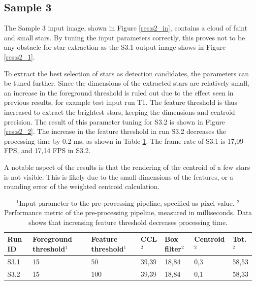 \documentclass[12pt]{report}
\begin{document}
\subsection*{Sample 3}
The Sample 3 input image, shown in Figure \ref{res:s2_in}, contains a cloud of faint and small stars. By tuning the input parameters correctly, this proves not to be any obstacle for star extraction as the S3.1 output image shows in Figure \ref{res:s2_1}.
\par
To extract the best selection of stars as detection candidates, the parameters can be tuned further. Since the dimensions of the extracted stars are relatively small, an increase in the foreground threshold is ruled out due to the effect seen in previous results, for example test input run T1. The feature threshold is thus increased to extract the brightest stars, keeping the dimensions and centroid precision. The result of this parameter tuning for S3.2 is shown in Figure \ref{res:s2_2}. The increase in the feature threshold in run S3.2 decreases the processing time by 0.2 ms, as shown in Table \ref{table:s2_res}. The frame rate of S3.1 is 17,09 FPS, and 17,14 FPS in S3.2.
\par
A notable aspect of the results is that the rendering of the centroid of a few stars is not visible. This is likely due to the small dimensions of the features, or a rounding error of the weighted centroid calculation.

\begin{table}[!h]
    \centering
    \begin{tabular}{|p{0.8cm}|p{2.5cm}|p{2cm}||p{1.25cm}|p{1.25cm}|p{1.9cm}|p{1cm}|}
        \hline
        \textbf{Run ID}&\textbf{Foreground threshold$^{1}$}&\textbf{Feature threshold$^{1}$}&\textbf{CCL$^{2}$}&\textbf{Box filter$^{2}$}&\textbf{Centroid$^{2}$}&\textbf{Tot.$^{2}$}\\
        \hline
        \hline
        S3.1&15&50&39,39&18,84&0,3&58,53\\
        \hline
        S3.2&15&100&39,39&18,84&0,1&58,33\\
        \hline
    \end{tabular}
    \caption{$^{1}$Input parameter to the pre-processing pipeline, specified as pixel value. $^{2}$Performance metric of the pre-processing pipeline, measured in milliseconds. Data shows that increasing feature threshold decreases processing time.}
    \label{table:s2_res}
\end{table}
\end{document}
